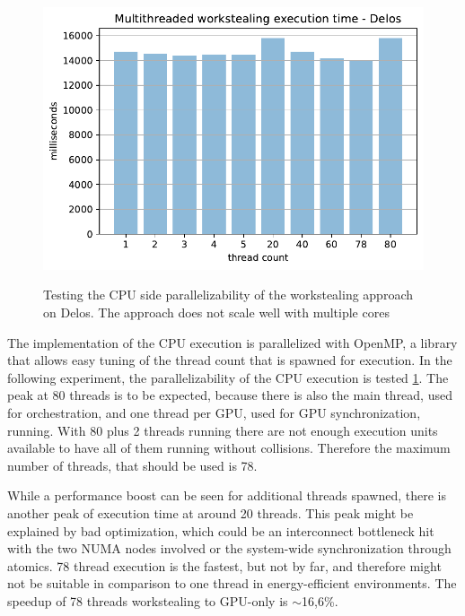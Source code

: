 \begin{figure}[H]
  \caption{Testing the CPU side parallelizability of the workstealing approach on Delos. The approach does not scale well with multiple cores}
  \includegraphics[width=\textwidth]{figures/threaded_wsteal.pdf}
  \centering
  \label{fig:wstealing_threaded_delos}
\end{figure}

The implementation of the CPU execution is parallelized with OpenMP, a library that allows easy tuning of the thread count that is spawned for execution. In the following experiment, the parallelizability of the CPU execution is tested \ref{fig:wstealing_threaded_delos}.
The peak at 80 threads is to be expected, because there is also the main thread, used for orchestration, and one thread per GPU, used for GPU synchronization, running. With 80 plus 2 threads running there are not enough execution units available to have all of them running without collisions. Therefore the maximum number of threads, that should be used is 78.

While a performance boost can be seen for additional threads spawned, there is another peak of execution time at around 20 threads. This peak might be explained by bad optimization, which could be an interconnect bottleneck hit with the two NUMA nodes involved or the system-wide synchronization through atomics. 78 thread execution is the fastest, but not by far, and therefore might not be suitable in comparison to one thread in energy-efficient environments. The speedup of 78 threads workstealing to GPU-only is $\sim$16,6\%.



